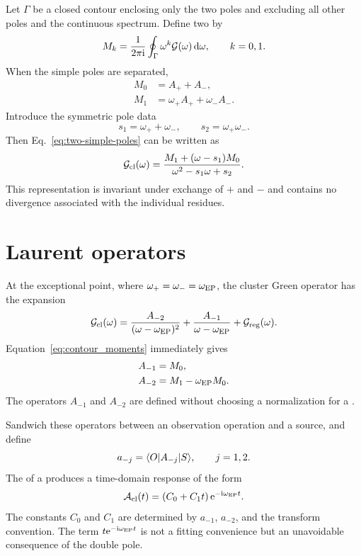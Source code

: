 Let $\Gamma$ be a  closed contour enclosing only the two poles and excluding all other poles and the continuous spectrum. Define two  by
\begin{equation}
M_k
=
\frac{1}{2\pi\mathrm{i}}
\oint_\Gamma
\omega^k\mathcal{G}(\omega)\,\mathrm{d}\omega,
\qquad
k=0,1.
\label{eq:contour_moments}
\end{equation}
When the simple poles are separated,
\begin{align}
M_0
&=
A_++A_-,
\label{eq:ep-moment-zero}
\\
M_1
&=
\omega_+A_+
+\omega_-A_-.
\label{eq:ep-moment-one}
\end{align}
Introduce the symmetric pole data
\begin{equation}
s_1=\omega_++\omega_- ,
\qquad
s_2=\omega_+\omega_-.
\end{equation}
Then Eq.~\eqref{eq:two-simple-poles} can be written as
\begin{equation}
\mathcal{G}_{\mathrm{cl}}(\omega)
=
\frac{
M_1+(\omega-s_1)M_0
}{
\omega^2-s_1\omega+s_2
}.
\label{eq:pair-resolvent-moments}
\end{equation}
This representation is invariant under exchange of $+$ and $-$ and contains no divergence associated with the individual residues.

\section{Laurent operators}

At the exceptional point, where $\omega_+=\omega_-=\omega_{\mathrm{EP}}$, the cluster Green operator has the expansion
\begin{equation}
\mathcal{G}_{\mathrm{cl}}(\omega)
=
\frac{A_{-2}}{(\omega-\omega_{\mathrm{EP}})^2}
+\frac{A_{-1}}{\omega-\omega_{\mathrm{EP}}}
+\mathcal{G}_{\mathrm{reg}}(\omega).
\label{eq:ep-laurent}
\end{equation}
Equation~\eqref{eq:contour_moments} immediately gives
\begin{align}
A_{-1}
&=
M_0,
\label{eq:ep-a-minus-one}
\\
A_{-2}
&=
M_1-\omega_{\mathrm{EP}} M_0.
\label{eq:ep-a-minus-two}
\end{align}
The operators $A_{-1}$ and $A_{-2}$ are defined without choosing a normalization for a .

Sandwich these operators between an observation operation and a source, and define
\begin{equation}
a_{-j}
=
\langle O \rvert A_{-j}\lvert S \rangle,
\qquad
j=1,2.
\end{equation}
The  of a  produces a time-domain response of the form
\begin{equation}
\mathcal{A}_{\mathrm{cl}}(t)
=
\left(C_0+C_1t\right)
\mathrm{e}^{-\mathrm{i}\omega_{\mathrm{EP}} t}.
\label{eq:ep-time-response}
\end{equation}
The constants $C_0$ and $C_1$ are determined by $a_{-1}$, $a_{-2}$, and the transform convention. The term $t\mathrm{e}^{-\mathrm{i}\omega_{\mathrm{EP}} t}$ is not a fitting convenience but an unavoidable consequence of the double pole.

